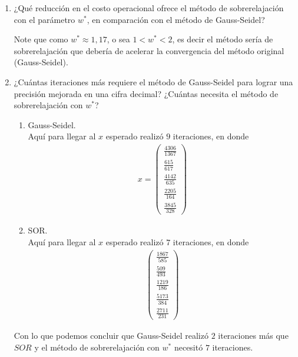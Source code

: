 \begin{homeworkProblem}
\begin{enumerate}
\begin{solucion}
      \end{solucion}
    \item ¿Qué reducción en el costo operacional ofrece el método de sobrerelajación con el parámetro $w^*$, en comparación con el método de Gauss-Seidel?
      \begin{solucion}
        Note que como $w^*\approx 1,17$, o sea $1<w^*<2$, es decir el método sería de sobrerelajación que debería de acelerar la convergencia del método original (Gauss-Seidel).  
      \end{solucion}
    \item ¿Cuántas iteraciones más requiere el método de Gauss-Seidel para lograr una precisión mejorada en una cifra decimal? ¿Cuántas necesita el método de sobrerelajación con $w^*$?
      \begin{solucion}
        \begin{enumerate}
          \item Gauss-Seidel.\\
            Aquí para llegar al $x$ esperado realizó $9$ iteraciones, en donde
            \begin{align*}
              x=\begin{pmatrix}
                \frac{4306}{1367}\\  
                \frac{615}{617}\\
                \frac{4142}{635}\\
                \frac{2205}{164}\\
                \frac{3845}{328}     
              \end{pmatrix}
            \end{align*}
          \item SOR.\\
            Aquí para llegar al $x$ esperado realizó $7$ iteraciones, en donde
            \begin{align*}
              \begin{pmatrix}
                \frac{1867}{585}\\
                \frac{509}{493}\\
                \frac{1219}{186}\\
                \frac{5173}{384}\\
                \frac{2711}{231}     
              \end{pmatrix}
            \end{align*}
        \end{enumerate}
        Con lo que podemos concluir que Gauss-Seidel realizó $2$ iteraciones más que $SOR$ y el método de sobrerelajación con $w^*$ necesitó $7$ iteraciones. 

\end{solucion}
\end{enumerate}
\end{homeworkProblem}
